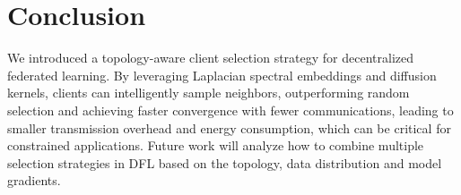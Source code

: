 \documentclass[journal]{IEEEtran}
\begin{document}
\section{Conclusion} 
\label{sec:concl}
We introduced a topology-aware client selection strategy for decentralized federated learning. By leveraging Laplacian spectral embeddings and diffusion kernels, clients can intelligently sample neighbors,  outperforming random selection and achieving faster convergence with fewer communications, leading to smaller transmission overhead and energy consumption, which can be critical for constrained applications. Future work will analyze how to combine multiple selection strategies in DFL based on the topology, data distribution and model gradients.



\end{document}
